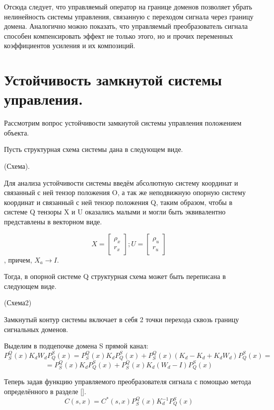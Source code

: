 \documentclass[a4paper]{article}
\begin{document}
Отсюда следует, что управляемый оператор на границе доменов позволяет убрать нелинейность системы управления, связанную с переходом сигнала через границу домена. Аналогично можно показать, что управляемый преобразователь сигнала способен компенсировать эффект не только этого, но и прочих переменных коэффициентов усиления и их композиций.

\section{Устойчивость замкнутой системы управления.}
Рассмотрим вопрос устойчивости замкнутой системы управления положением объекта.

Пусть структурная схема системы дана в следующем виде.

(Схема).

Для анализа устойчивости системы введём абсолютную систему координат и связанный с ней тензор положения O, а так же неподвижную опорную систему координат и связанный с ней тензор положения Q, таким образом, чтобы в системе Q тензоры X и U оказались малыми и могли быть эквивалентно представлены в векторном виде.

\begin{equation}
X = \begin{bmatrix}\rho_x\\r_x\end{bmatrix};  
U = \begin{bmatrix}\rho_u\\r_u\end{bmatrix}
\end{equation},
причем, $X_a \rightarrow I$.

Тогда, в опорной системе Q структурная схема может быть переписана в следующем виде.

(Схема2)

Замкнутый контур системы включает в себя 2 точки перехода сквозь границу сигнальных доменов.

Выделим в подцепочке домена S прямой канал:
\begin{equation*} 
P_S^Q(x) K_d W_d P_Q^S(x) = P_S^Q(x) K_d P_Q^S(x) + P_S^Q(x) (K_d - K_d + K_d W_d) P_Q^S(x) = 
\end{equation*}
\begin{equation} 
=P_S^Q(x) K_d P_Q^S(x) + P_S^Q(x) K_d (W_d - I) P_Q^S(x) 
\end{equation}

Теперь задав функцию управляемого преобразователя сигнала с помощью метода определённого в разделе [].
\begin{equation} C(s,x) = C^*(s,x) P_S^Q(x) K_{d}^{-1} P_Q^S(x) \end{equation}
\end{document}
